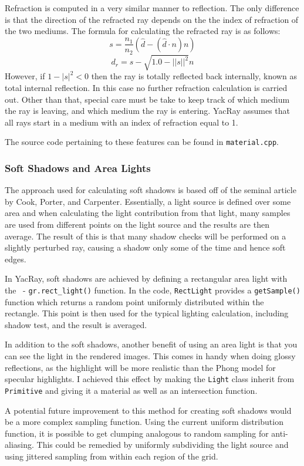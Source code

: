 \documentclass[12pt]{article}
\begin{document}
Refraction is computed in a very similar manner to reflection. The only difference is that the direction of the refracted ray depends on the the index of refraction of the two mediums. The formula for calculating the refracted ray is as follows:
$$s = \frac{n_1}{n_2}(\hat{d}-(\hat{d}\cdot n)n)$$
$$d_r = s - \sqrt{1.0 - ||s||^2}n$$
However, if $1 - |s|^2<0$ then the ray is totally reflected back internally, known as total internal reflection. In this case no further refraction calculation is carried out. Other than that, special care must be take to keep track of which medium the ray is leaving, and which medium the ray is entering. YacRay assumes that all rays start in a medium with an index of refraction equal to 1.

The source code pertaining to these features can be found in \texttt{material.cpp}.

\subsubsection{Soft Shadows and Area Lights}

The approach used for calculating soft shadows is based off of the seminal article by Cook, Porter, and Carpenter\cite{distributed}. Essentially, a light source is defined over some area and when calculating the light contribution from that light, many samples are used from different points on the light source and the results are then average. The result of this is that many shadow checks will be performed on a slightly perturbed ray, causing a shadow only some of the time and hence soft edges.

In YacRay, soft shadows are achieved by defining a rectangular area light with the \ - \texttt{gr.rect\_light()} function. In the code, \texttt{RectLight} provides a \texttt{getSample()} function which returns a random point uniformly distributed within the rectangle. This point is then used for the typical lighting calculation, including shadow test, and the result is averaged.

In addition to the soft shadows, another benefit of using an area light is that you can see the light in the rendered images. This comes in handy when doing glossy reflections, as the highlight will be more realistic than the Phong model for specular highlights. I achieved this effect by making the \texttt{Light} class inherit from \texttt{Primitive} and giving it a material as well as an intersection function.

A potential future improvement to this method for creating soft shadows would be a more complex sampling function. Using the current uniform distribution function, it is possible to get clumping analogous to random sampling for anti-aliasing. This could be remedied by uniformly subdividing the light source and using jittered sampling from within each region of the grid.
\end{document}
